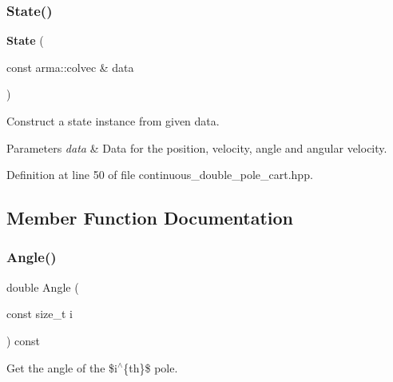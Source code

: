 \subsubsection{State()\hspace{0.1cm}{\footnotesize\ttfamily [2/2]}}
{\footnotesize\ttfamily \textbf{ State} (\begin{DoxyParamCaption}\item[{const arma\+::colvec \&}]{data }\end{DoxyParamCaption})\hspace{0.3cm}{\ttfamily [inline]}}



Construct a state instance from given data. 


\begin{DoxyParams}{Parameters}
{\em data} & Data for the position, velocity, angle and angular velocity. \\
\hline
\end{DoxyParams}


Definition at line 50 of file continuous\+\_\+double\+\_\+pole\+\_\+cart.\+hpp.



\subsection{Member Function Documentation}
\mbox{\label{classmlpack_1_1rl_1_1ContinuousDoublePoleCart_1_1State_a6faedb6fad4a1761e5bc5f2c9f061131}} 
\subsubsection{Angle()\hspace{0.1cm}{\footnotesize\ttfamily [1/2]}}
{\footnotesize\ttfamily double Angle (\begin{DoxyParamCaption}\item[{const size\+\_\+t}]{i }\end{DoxyParamCaption}) const\hspace{0.3cm}{\ttfamily [inline]}}



Get the angle of the \$i$^\wedge$\{th\}\$ pole. 




